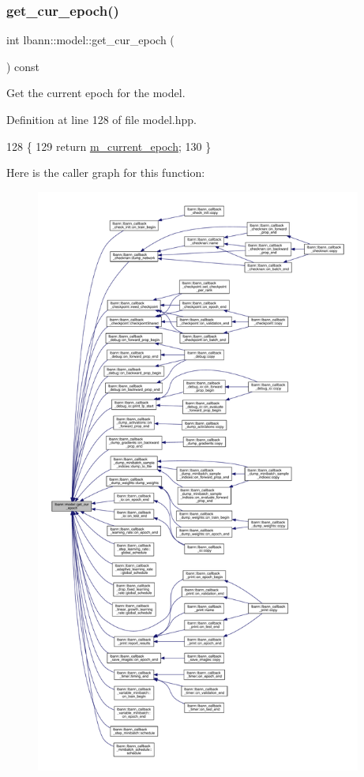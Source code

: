 \subsubsection{\texorpdfstring{get\+\_\+cur\+\_\+epoch()}{get\_cur\_epoch()}}
{\footnotesize\ttfamily int lbann\+::model\+::get\+\_\+cur\+\_\+epoch (\begin{DoxyParamCaption}{ }\end{DoxyParamCaption}) const\hspace{0.3cm}{\ttfamily [inline]}}

Get the current epoch for the model. 

Definition at line 128 of file model.\+hpp.


\begin{DoxyCode}
128                                    \{
129     \textcolor{keywordflow}{return} \hyperlink{classlbann_1_1model_a305fac94b9063e59198c7f936923221a}{m\_current\_epoch};
130   \}
\end{DoxyCode}
Here is the caller graph for this function\+:\nopagebreak
\begin{figure}[H]
\begin{center}
\leavevmode
\includegraphics[height=550pt]{classlbann_1_1model_a1cf70e098524cc5013bce56edd96dfe7_icgraph}
\end{center}
\end{figure}
